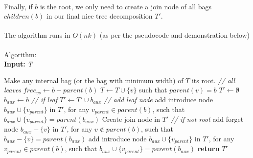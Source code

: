 \documentclass{article}
\newcommand\tab[1][1cm]{\hspace*{#1}}
\begin{document}
\\
\tab Finally, if $b$ is the root, we only need to create a join node of all bags $children(b)$ in our final nice tree decomposition $T'$.
\\
\\
The algorithm runs in $O(nk)$ (as per the pseudocode and demonstration below)
\\
\\
Algorithm:\\
\textbf{Input:} \textit{T}
\begin{algorithmic}
\State Make any internal bag (or the bag with minimum width) of $T$ its root.
 \textit{// all leaves}
  \State $free_{vs} \gets b - parent(b)$
    \State $T \gets T \cup \{v \}$ such that $parent(v) = b$
  \EndFor
\EndFor
\State $T' \gets \emptyset $
  \State $b_{aux} \gets b$
   \textit{// if leaf}
    \State $T' \gets T' \cup b_{aux}$ \textit{// add leaf node}
      \State add introduce node $b_{aux} \cup \{ v_{parent}\} $ in $T'$, for any $ v_{parent} \in parent(b)$,
      \State such that $b_{aux} \cup \{ v_{parent}\} = parent(b_{aux})$
    \EndWhile
  \Else
    \State Create join node in $T'$
     \textit{// if not root}
      \State add forget node $b_{aux} - \{ v\} $ in $T'$, for any $ v \notin parent(b)$,
      \State such that $b_{aux} - \{ v\} = parent(b_{aux})$
      \EndWhile
      \State add introduce node $b_{aux} \cup \{ v_{parent}\} $ in $T'$,
      \State for any $ v_{parent} \in parent(b)$, such that $b_{aux} \cup \{ v_{parent}\} = parent(b_{aux})$
    \EndWhile
    \EndIf
  \EndIf
\State
\EndFor
\State \textbf{return} $T'$
\end{algorithmic} 
\newpage
\end{document}

